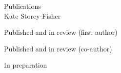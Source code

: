 \documentclass[11pt]{article}
\newenvironment{cvlist_tight}[1]
{\begin{cvlist}{#1}
\setlength{\itemsep}{3pt}
\setlength{\parskip}{2pt} }
{\end{cvlist} }
\begin{document}
\begin{cv}{\huge{Publications}\vspace{0.5ex}\\ \large{Kate Storey-Fisher}}
\setlength{\cvlabelwidth}{8em} %


\vspace{1ex}

\begin{cvlist_tight}{Published and in review (first author)}

\end{cvlist_tight}

\begin{cvlist_tight}{Published and in review (co-author)}

\end{cvlist_tight}

\begin{cvlist_tight}{In preparation}

\end{cvlist_tight}

\end{cv}
\end{document}
